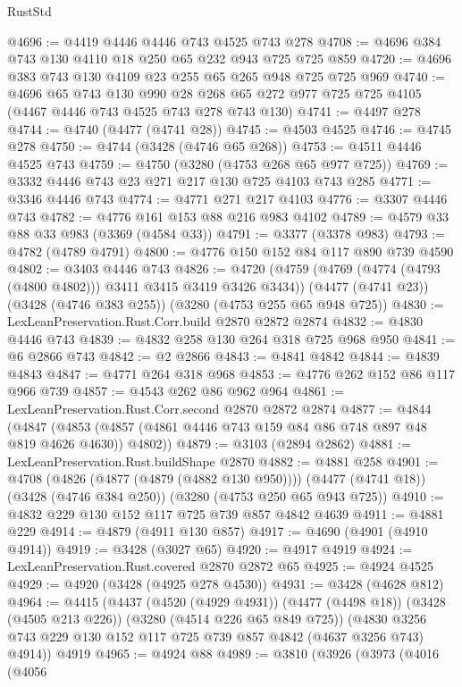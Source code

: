 \begin{lexlean}{RustStd}
\begin{coremodule}
@4696 := @4419 @4446 @4446 @743 @4525 @743 @278
@4708 := @4696 @384 @743 @130 @4110 @18 @250 @65 @232 @943 @725 @725 @859
@4720 := @4696 @383 @743 @130 @4109 @23 @255 @65 @265 @948 @725 @725 @969
@4740 := @4696
    @65
    @743
    @130
    @990
    @28
    @268
    @65
    @272
    @977
    @725
    @725
    @4105
    (@4467 @4446 @743 @4525 @743 @278 @743 @130)
@4741 := @4497 @278
@4744 := @4740 (@4477 (@4741 @28))
@4745 := @4503 @4525
@4746 := @4745 @278
@4750 := @4744 (@3428 (@4746 @65 @268))
@4753 := @4511 @4446 @4525 @743
@4759 := @4750 (@3280 (@4753 @268 @65 @977 @725))
@4769 := @3332 @4446 @743 @23 @271 @217 @130 @725 @4103 @743 @285
@4771 := @3346 @4446 @743
@4774 := @4771 @271 @217 @4103
@4776 := @3307 @4446 @743
@4782 := @4776 @161 @153 @88 @216 @983 @4102
@4789 := @4579 @33 @88 @33 @983 (@3369 (@4584 @33))
@4791 := @3377 (@3378 @983)
@4793 := @4782 (@4789 @4791)
@4800 := @4776 @150 @152 @84 @117 @890 @739 @4590
@4802 := @3403 @4446 @743
@4826 := @4720
    (@4759 (@4769 (@4774 (@4793 (@4800 @4802))) @3411 @3415 @3419 @3426 @3434))
    (@4477 (@4741 @23))
    (@3428 (@4746 @383 @255))
    (@3280 (@4753 @255 @65 @948 @725))
@4830 := LexLeanPreservation.Rust.Corr.build @2870 @2872 @2874
@4832 := @4830 @4446 @743
@4839 := @4832 @258 @130 @264 @318 @725 @968 @950
@4841 := @6 @2866 @743
@4842 := @2 @2866
@4843 := @4841 @4842
@4844 := @4839 @4843
@4847 := @4771 @264 @318 @968
@4853 := @4776 @262 @152 @86 @117 @966 @739
@4857 := @4543 @262 @86 @962 @964
@4861 := LexLeanPreservation.Rust.Corr.second @2870 @2872 @2874
@4877 := @4844
    (@4847 (@4853 (@4857 (@4861 @4446 @743 @159 @84 @86 @748 @897 @48 @819 @4626 @4630)) @4802))
@4879 := @3103 (@2894 @2862)
@4881 := LexLeanPreservation.Rust.buildShape @2870
@4882 := @4881 @258
@4901 := @4708
    (@4826 (@4877 (@4879 (@4882 @130 @950))))
    (@4477 (@4741 @18))
    (@3428 (@4746 @384 @250))
    (@3280 (@4753 @250 @65 @943 @725))
@4910 := @4832 @229 @130 @152 @117 @725 @739 @857 @4842 @4639
@4911 := @4881 @229
@4914 := @4879 (@4911 @130 @857)
@4917 := @4690 (@4901 (@4910 @4914))
@4919 := @3428 (@3027 @65)
@4920 := @4917 @4919
@4924 := LexLeanPreservation.Rust.covered @2870 @2872 @65
@4925 := @4924 @4525
@4929 := @4920 (@3428 (@4925 @278 @4530))
@4931 := @3428 (@4628 @812)
@4964 := @4415
    (@4437
      (@4520 (@4929 @4931))
      (@4477 (@4498 @18))
      (@3428 (@4505 @213 @226))
      (@3280 (@4514 @226 @65 @849 @725))
      (@4830 @3256 @743 @229 @130 @152 @117 @725 @739 @857 @4842 (@4637 @3256 @743) @4914))
    @4919
@4965 := @4924 @88
@4989 := @3810
    (@3926
      (@3973
        (@4016
          (@4056

\end{coremodule}
\end{lexlean}
